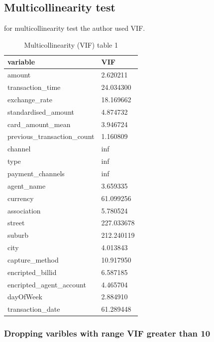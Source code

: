 \subsection{Multicollinearity test}
for multicollinearity test the author used VIF.
\newpage 
\begin{table}[h]
    \centering
    \begin{tabular}{|l|l|}
      \hline
      variable & VIF \\ \hline
      amount &   2.620211\\ \hline
             transaction\_time &  24.034300\\ \hline
              exchange\_rate  & 18.169662\\ \hline
                        standardised\_amount  &  4.874732\\ \hline
             card\_amount\_mean  &  3.946724\\ \hline
   previous\_transaction\_count &   1.160809\\ \hline
                      channel    &     inf\\ \hline
                         type    &     inf\\ \hline
             payment\_channels     &    inf\\ \hline
                  agent\_name   & 3.659335\\ \hline
                   currency  & 61.099256\\ \hline
                 association  &  5.780524\\ \hline
                     street & 227.033678\\ \hline
                     suburb & 212.240119\\ \hline
                        city  &  4.013843\\ \hline
             capture\_method &  10.917950\\ \hline
           encripted\_billid  &  6.587185\\ \hline
     encripted\_agent\_account  &  4.465704\\ \hline
                   dayOfWeek  &  2.884910\\ \hline
            transaction\_date &  61.289448\\ \hline
    \end{tabular}
    \caption{Multicollinearity (VIF) table 1}
    \label{Multicollinearity (VIF) table 1}
  \end{table}
\subsubsection{Dropping varibles with range VIF greater than 10}

